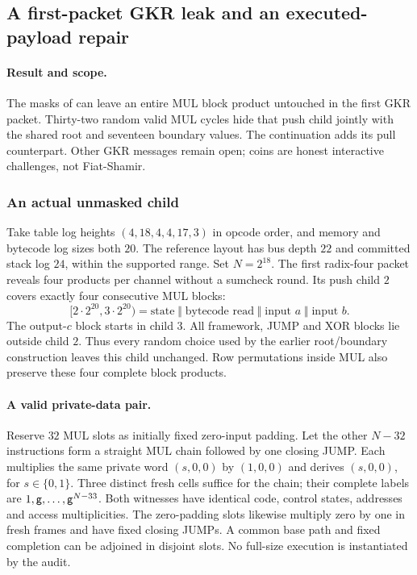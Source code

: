 \subsection{A first-packet GKR leak and an executed-payload repair}\label{note:zk-gkr-coarse}

\paragraph{Result and scope.} The masks of  can leave an entire MUL block product untouched in the first GKR packet. Thirty-two random valid MUL cycles hide that push child jointly with the shared root and seventeen boundary values. The continuation  adds its pull counterpart. Other GKR messages remain open; coins are honest interactive challenges, not Fiat-Shamir.

\subsubsection{An actual unmasked child}

Take table log heights $(4,18,4,4,17,3)$ in opcode order, and memory and bytecode log sizes both $20$. The reference layout has bus depth $22$ and committed stack log $24$, within the supported range. Set $N=2^{18}$. The first radix-four packet reveals four products per channel without a sumcheck round. Its push child $2$ covers exactly four consecutive MUL blocks:
\[
 [2\cdot2^{20},3\cdot2^{20})
 =\text{state}\;\Vert\;\text{bytecode read}\;\Vert\;\text{input }a\;\Vert\;\text{input }b.
\]
The output-$c$ block starts in child $3$. All framework, JUMP and XOR blocks lie outside child $2$. Thus every random choice used by the earlier root/boundary construction leaves this child unchanged. Row permutations inside MUL also preserve these four complete block products.

\paragraph{A valid private-data pair.} Reserve $32$ MUL slots as initially fixed zero-input padding. Let the other $N-32$ instructions form a straight MUL chain followed by one closing JUMP. Each multiplies the same private word $(s,0,0)$ by $(1,0,0)$ and derives $(s,0,0)$, for $s\in\{0,1\}$. Three distinct fresh cells suffice for the chain; their complete labels are $1,\mathsf{g},\ldots,\mathsf{g}^{N-33}$. Both witnesses have identical code, control states, addresses and access multiplicities. The zero-padding slots likewise multiply zero by one in fresh frames and have fixed closing JUMPs. A common base path and fixed completion can be adjoined in disjoint slots. No full-size execution is instantiated by the audit.

